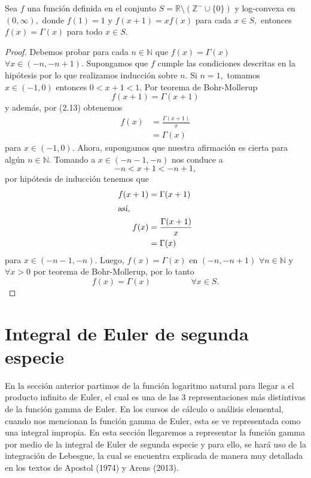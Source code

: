 \begin{corollary}
	Sea $f$ una función definida en el conjunto $S = \mathbb{R}\texttt{\textbackslash}(\mathbb{Z}^-\cup \{0\})$ y log-convexa en $(0,\infty),$ donde $f(1) = 1$ y $f(x+1) = xf(x)$ para cada $x \in S,$ entonces $f(x) = \Gamma(x)$ para todo $x \in S.$
\end{corollary}
\begin{proof}
	Debemos probar para cada $n \in \mathbb{N}$ que $f(x) = \Gamma(x)$ $\forall x \in (-n,-n+1).$ Supongamos que $f$ cumple las condiciones descritas en la hipótesis por lo que realizamos inducción sobre $n.$ Si $n = 1,$ tomamos $x \in (-1,0)$ entonces $0 < x+1 < 1.$ Por teorema de Bohr-Mollerup $$f(x+1) = \Gamma(x+1)$$ y además, por (2.13) obtenemos
	\begin{align*}
	f(x) &= \frac{\Gamma(x+1)}{x}\\
	&= \Gamma(x)
	\end{align*}
	para $x \in (-1,0).$ Ahora, supongamos que nuestra afirmación es cierta para algún $n \in \mathbb{N}.$ Tomando a $x \in (-n-1,-n)$ nos conduce a $$-n < x+1 < -n+1,$$ por hipótesis de inducción tenemos que
	\begin{align*}
	f(x+1) &= \Gamma(x+1)\\
	\intertext{así,}
	f(x) &= \frac{\Gamma(x+1)}{x}\\
	&= \Gamma(x)
	\end{align*}
	para $x \in (-n-1,-n).$ Luego, $f(x) = \Gamma(x)$ en $(-n,-n+1)$ $\forall n \in \mathbb{N}$ y $\forall x > 0$ por teorema de Bohr-Mollerup, por lo tanto $$f(x) = \Gamma(x)\hspace{2cm}\forall x \in S.$$
\end{proof}

\section{Integral de Euler de segunda especie}
En la sección anterior partimos de la función logaritmo natural para llegar a el producto infinito de Euler, el cual es una de las 3 representaciones más distintivas de la función gamma de Euler. En los cursos de cálculo o análisis elemental, cuando nos mencionan la función gamma de Euler, esta se ve representada como una integral impropia. En esta sección llegaremos a representar la función gamma por medio de la integral de Euler de segunda especie y para ello, se hará uso de la integración de Lebesgue, la cual se encuentra explicada de manera muy detallada en los textos de Apostol (1974) y Arens (2013).

